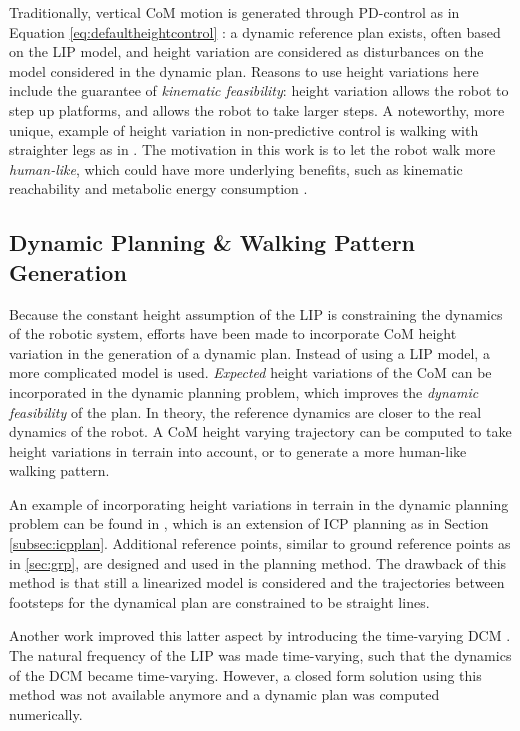 Traditionally, vertical \ac{CoM} motion is generated through PD-control as in Equation \ref{eq:defaultheightcontrol} \cite{kajita2003resolved, koolen2016design}: a dynamic reference plan exists, often based on the LIP model, and height variation are considered as disturbances on the model considered in the dynamic plan. Reasons to use height variations here include the guarantee of \textit{kinematic feasibility}: height variation allows the robot to step up platforms, and allows the robot to take larger steps. A noteworthy, more unique, example of height variation in non-predictive control is walking with straighter legs as in \cite{griffin2018straight}. The motivation in this work is to let the robot walk more \textit{human-like}, which could have more underlying benefits, such as kinematic reachability and metabolic energy consumption \cite{wang2012optimizing}.

\subsection{Dynamic Planning \& Walking Pattern Generation}
Because the constant height assumption of the \ac{LIP} is constraining the dynamics of the robotic system, efforts have been made to incorporate CoM height variation in the generation of a dynamic plan. Instead of using a LIP model, a more complicated model is used. \textit{Expected} height variations of the CoM can be incorporated in the dynamic planning problem, which improves the \textit{dynamic feasibility} of the plan. In theory, the reference dynamics are closer to the real dynamics of the robot. A \ac{CoM} height varying trajectory can be computed to take height variations in terrain into account, or to generate a more human-like walking pattern. 

An example of incorporating height variations in terrain in the dynamic planning problem can be found in \cite{englsberger2013three}, which is an extension of \ac{ICP} planning as in Section \ref{subsec:icpplan}. Additional reference points, similar to ground reference points as in \ref{sec:grp}, are designed and used in the planning method. The drawback of this method is that still a linearized model is considered and the trajectories between footsteps for the dynamical plan are constrained to be straight lines. 

Another work improved this latter aspect by introducing the time-varying \ac{DCM} \cite{hopkins2014humanoid}. The natural frequency of the \ac{LIP} was made time-varying, such that the dynamics of the \ac{DCM} became time-varying. However, a closed form solution using this method was not available anymore and a dynamic plan was computed numerically.

